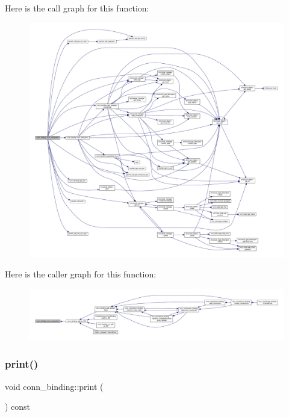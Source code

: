 Here is the call graph for this function\+:
\nopagebreak
\begin{figure}[H]
\begin{center}
\leavevmode
\includegraphics[width=350pt]{d2/db1/classconn__binding_ab815fc2d481fffaa79d9659e3808616b_cgraph}
\end{center}
\end{figure}
Here is the caller graph for this function\+:
\nopagebreak
\begin{figure}[H]
\begin{center}
\leavevmode
\includegraphics[width=350pt]{d2/db1/classconn__binding_ab815fc2d481fffaa79d9659e3808616b_icgraph}
\end{center}
\end{figure}
\mbox{\label{classconn__binding_afa60c298700898adbe9f7c03a4b5cd48}} 
\subsubsection{\texorpdfstring{print()}{print()}}
{\footnotesize\ttfamily void conn\+\_\+binding\+::print (\begin{DoxyParamCaption}{ }\end{DoxyParamCaption}) const\hspace{0.3cm}{\ttfamily [virtual]}}



